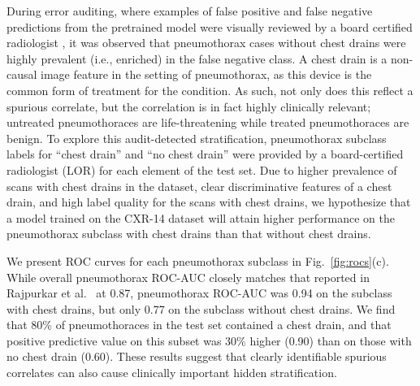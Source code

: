 \documentclass[sigconf]{acmart}
\begin{document}
During error auditing, where examples of false positive and false negative predictions from the pretrained model were visually reviewed by a board certified radiologist \citep{Oakden-Rayner2019-yi},
it was observed that pneumothorax cases without chest drains were highly prevalent (i.e., enriched) in the false negative class.
A chest drain is a non-causal image feature in the setting of pneumothorax, as this device is the common form of treatment for the condition. 
As such, not only does this reflect a spurious correlate, but the correlation is in fact highly clinically relevant; untreated pneumothoraces are life-threatening while treated pneumothoraces are benign.
 To explore this audit-detected stratification, pneumothorax subclass labels for ``chest drain'' and ``no chest drain'' were provided by a board-certified radiologist (LOR) for each element of the test set.  
 Due to higher prevalence of scans with chest drains in the dataset, clear discriminative features of a chest drain, and high label quality for the scans with chest drains, we hypothesize that a model trained on the CXR-14 dataset will attain higher performance on the pneumothorax subclass with chest drains than that without chest drains.  
 

We present ROC curves for each pneumothorax subclass in Fig.~\ref{fig:rocs}(c).  
While overall pneumothorax ROC-AUC closely matches that reported in Rajpurkar et al.~\citep{rajpurkar2017chexnet} at 0.87, pneumothorax ROC-AUC was 0.94 on the subclass with chest drains, but only 0.77 on the subclass without chest drains.  
We find that 80\% of pneumothoraces in the test set contained a chest drain, and that positive predictive value on this subset was 30\% higher (0.90) than on those with no chest drain (0.60).  
These results suggest that clearly identifiable spurious correlates can also cause clinically important hidden stratification.
\end{document}
